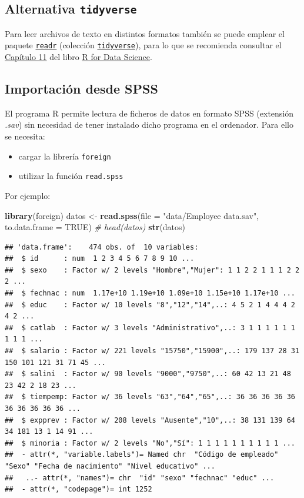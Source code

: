 \documentclass[]{book}
\newenvironment{Shaded}{\begin{snugshade}}{\end{snugshade}}
\newcommand{\KeywordTok}[1]{\textcolor[rgb]{0.13,0.29,0.53}{\textbf{#1}}}
\newcommand{\DataTypeTok}[1]{\textcolor[rgb]{0.13,0.29,0.53}{#1}}
\newcommand{\StringTok}[1]{\textcolor[rgb]{0.31,0.60,0.02}{#1}}
\newcommand{\CommentTok}[1]{\textcolor[rgb]{0.56,0.35,0.01}{\textit{#1}}}
\newcommand{\OtherTok}[1]{\textcolor[rgb]{0.56,0.35,0.01}{#1}}
\newcommand{\NormalTok}[1]{#1}
\begin{document}
\subsection{\texorpdfstring{Alternativa
\texttt{tidyverse}}{Alternativa tidyverse}}\label{alternativa-tidyverse}

Para leer archivos de texto en distintos formatos también se puede
emplear el paquete \href{https://readr.tidyverse.org}{\texttt{readr}}
(colección \href{https://www.tidyverse.org/}{\texttt{tidyverse}}), para
lo que se recomienda consultar el
\href{https://r4ds.had.co.nz/data-import.html}{Capítulo 11} del libro
\href{http://r4ds.had.co.nz}{R for Data Science}.

\subsection{Importación desde SPSS}\label{importacion-desde-spss}

El programa R permite lectura de ficheros de datos en formato SPSS
(extensión \emph{.sav}) sin necesidad de tener instalado dicho programa
en el ordenador. Para ello se necesita:

\begin{itemize}
\item
  cargar la librería \texttt{foreign}
\item
  utilizar la función \texttt{read.spss}
\end{itemize}

Por ejemplo:

\begin{Shaded}
\begin{Highlighting}[]
\KeywordTok{library}\NormalTok{(foreign)}
\NormalTok{datos <-}\StringTok{ }\KeywordTok{read.spss}\NormalTok{(}\DataTypeTok{file =} \StringTok{"data/Employee data.sav"}\NormalTok{, }\DataTypeTok{to.data.frame =} \OtherTok{TRUE}\NormalTok{)}
\CommentTok{# head(datos)}
\KeywordTok{str}\NormalTok{(datos)}
\end{Highlighting}
\end{Shaded}

\begin{verbatim}
## 'data.frame':    474 obs. of  10 variables:
##  $ id      : num  1 2 3 4 5 6 7 8 9 10 ...
##  $ sexo    : Factor w/ 2 levels "Hombre","Mujer": 1 1 2 2 1 1 1 2 2 2 ...
##  $ fechnac : num  1.17e+10 1.19e+10 1.09e+10 1.15e+10 1.17e+10 ...
##  $ educ    : Factor w/ 10 levels "8","12","14",..: 4 5 2 1 4 4 4 2 4 2 ...
##  $ catlab  : Factor w/ 3 levels "Administrativo",..: 3 1 1 1 1 1 1 1 1 1 ...
##  $ salario : Factor w/ 221 levels "15750","15900",..: 179 137 28 31 150 101 121 31 71 45 ...
##  $ salini  : Factor w/ 90 levels "9000","9750",..: 60 42 13 21 48 23 42 2 18 23 ...
##  $ tiempemp: Factor w/ 36 levels "63","64","65",..: 36 36 36 36 36 36 36 36 36 36 ...
##  $ expprev : Factor w/ 208 levels "Ausente","10",..: 38 131 139 64 34 181 13 1 14 91 ...
##  $ minoria : Factor w/ 2 levels "No","Sí": 1 1 1 1 1 1 1 1 1 1 ...
##  - attr(*, "variable.labels")= Named chr  "Código de empleado" "Sexo" "Fecha de nacimiento" "Nivel educativo" ...
##   ..- attr(*, "names")= chr  "id" "sexo" "fechnac" "educ" ...
##  - attr(*, "codepage")= int 1252
\end{verbatim}
\end{document}
